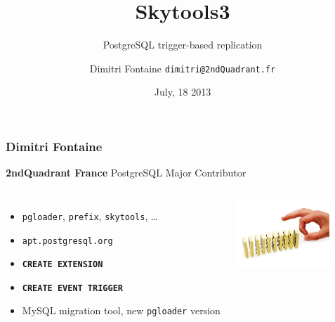 \documentclass{beamer}
\title{Skytools3}
\subtitle{PostgreSQL trigger-based replication}
\author{Dimitri Fontaine \texttt{dimitri@2ndQuadrant.fr}}
\date{July, 18 2013}
\begin{document}
\frame{\titlepage}

\begin{frame}[fragile]
  \frametitle{Dimitri Fontaine}

  \begin{center}
    \textbf{2ndQuadrant France}
    \linebreak
    PostgreSQL Major Contributor
  \end{center}
  \vfill

\begin{columns}[c]

  \begin{itemize}
   \item<1-> \texttt{pgloader}, \texttt{prefix}, \texttt{skytools}, …
   \item<1-> \texttt{apt.postgresql.org}
   \item<2-> \texttt{\textbf{CREATE EXTENSION}}
   \item<2-> \texttt{\textbf{CREATE EVENT TRIGGER}}
   \item<3-> MySQL migration tool, new \texttt{pgloader} version
  \end{itemize}  

\begin{center}
  \includegraphics[height=7em]{event-trigger.jpg}
\end{center}
\end{columns}
\end{frame}
\end{document}
